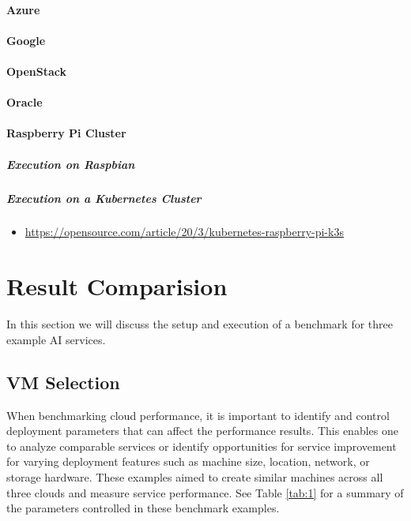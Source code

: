 \hypertarget{azure}{%
\paragraph{Azure}\label{azure}}

\hypertarget{google}{%
\paragraph{Google}\label{google}}

\hypertarget{openstack}{%
\paragraph{OpenStack}\label{openstack}}

\hypertarget{oracle}{%
\paragraph{Oracle}\label{oracle}}

\hypertarget{raspberry-pi-cluster}{%
\paragraph{Raspberry Pi Cluster}\label{raspberry-pi-cluster}}

\hypertarget{execution-on-raspbian}{%
\subparagraph{Execution on Raspbian}\label{execution-on-raspbian}}

\hypertarget{execution-on-a-kubernetes-cluster}{%
\subparagraph{Execution on a Kubernetes
Cluster}\label{execution-on-a-kubernetes-cluster}}

\begin{itemize}
\tightlist
\item
  \url{https://opensource.com/article/20/3/kubernetes-raspberry-pi-k3s}
\end{itemize}

\section{Result Comparision}\label{result-comparision}

In this section we will discuss the setup and execution of a benchmark
for three example AI services.

\subsection{VM Selection}\label{vm-selection}

When benchmarking cloud performance, it is important to identify and
control deployment parameters that can affect the performance results.
This enables one to analyze comparable services or identify
opportunities for service improvement for varying deployment features
such as machine size, location, network, or storage hardware. These
examples aimed to create similar machines across all three clouds and
measure service performance. See Table \ref{tab:1} for a summary of the parameters
controlled in these benchmark examples.

